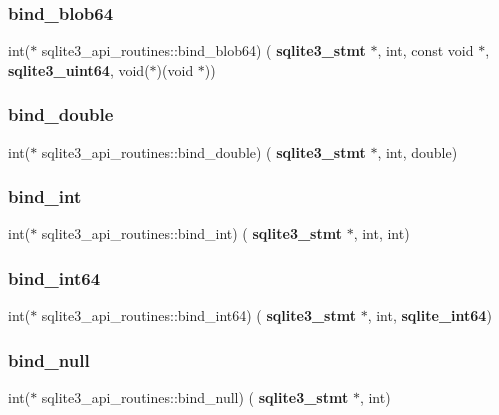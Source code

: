 \subsubsection{bind\_blob64}
{\footnotesize\ttfamily int($\ast$ sqlite3\+\_\+api\+\_\+routines\+::bind\+\_\+blob64) (\textbf{ sqlite3\+\_\+stmt} $\ast$, int, const void $\ast$, \textbf{ sqlite3\+\_\+uint64}, void($\ast$)(void $\ast$))}

\mbox{\label{structsqlite3__api__routines_abcdefbe78ab3ce4324d86651c03e8470}} 
\subsubsection{bind\_double}
{\footnotesize\ttfamily int($\ast$ sqlite3\+\_\+api\+\_\+routines\+::bind\+\_\+double) (\textbf{ sqlite3\+\_\+stmt} $\ast$, int, double)}

\mbox{\label{structsqlite3__api__routines_a70b6cc78957f11ff206df6125973daea}} 
\subsubsection{bind\_int}
{\footnotesize\ttfamily int($\ast$ sqlite3\+\_\+api\+\_\+routines\+::bind\+\_\+int) (\textbf{ sqlite3\+\_\+stmt} $\ast$, int, int)}

\mbox{\label{structsqlite3__api__routines_ac71b110c165973291cc257973e7d6243}} 
\subsubsection{bind\_int64}
{\footnotesize\ttfamily int($\ast$ sqlite3\+\_\+api\+\_\+routines\+::bind\+\_\+int64) (\textbf{ sqlite3\+\_\+stmt} $\ast$, int, \textbf{ sqlite\+\_\+int64})}

\mbox{\label{structsqlite3__api__routines_a78d546c352de656db3c15e7cc6255228}} 
\subsubsection{bind\_null}
{\footnotesize\ttfamily int($\ast$ sqlite3\+\_\+api\+\_\+routines\+::bind\+\_\+null) (\textbf{ sqlite3\+\_\+stmt} $\ast$, int)}

